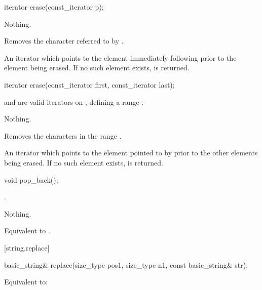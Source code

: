 %
\begin{itemdecl}
iterator erase(const_iterator p);
\end{itemdecl}

\begin{itemdescr}
\pnum
\throws Nothing.

\pnum
\effects
Removes the character referred to by .

\pnum
\returns
An iterator which points to the element immediately following  prior to
the element being erased.
If no such element exists,
is returned.
\end{itemdescr}

%
\begin{itemdecl}
iterator erase(const_iterator first, const_iterator last);
\end{itemdecl}

\begin{itemdescr}
\pnum
\requires
{} and  are valid iterators on
,
defining a range
\tcode{[first, last)}.

\pnum
\throws Nothing.

\pnum
\effects
Removes the characters in the range
\tcode{[first, last)}.

\pnum
\returns
An iterator which points to the element pointed to by  prior to
the other elements being erased.
If no such element exists,
is returned.
\end{itemdescr}

%
\begin{itemdecl}
void pop_back();
\end{itemdecl}

\begin{itemdescr}
\pnum
\requires
{}.

\pnum
\throws Nothing.

\pnum
\effects
Equivalent to .
\end{itemdescr}

[string.replace]{}

%
\begin{itemdecl}
basic_string& replace(size_type pos1, size_type n1, const basic_string& str);
\end{itemdecl}

\begin{itemdescr}
\pnum
\effects Equivalent to: 
\end{itemdescr}

